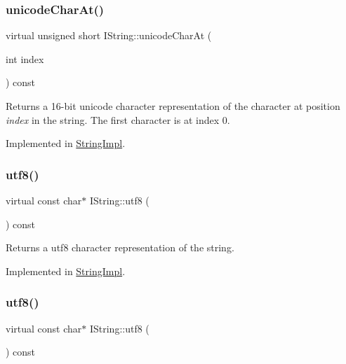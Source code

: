 \subsubsection{\texorpdfstring{unicodeCharAt()}{unicodeCharAt()}\hspace{0.1cm}{\footnotesize\ttfamily [2/2]}}
{\footnotesize\ttfamily virtual unsigned short I\+String\+::unicode\+Char\+At (\begin{DoxyParamCaption}\item[{int}]{index }\end{DoxyParamCaption}) const\hspace{0.3cm}{\ttfamily [pure virtual]}}

Returns a 16-\/bit unicode character representation of the character at position {\itshape index} in the string. The first character is at index 0. 

Implemented in \mbox{\hyperlink{class_string_impl_a002b2e0e2a91769a583437b6510ed409}{String\+Impl}}.

\mbox{\label{class_i_string_a552cdb2900b094a432a8608df7bcce8c}} 
\subsubsection{\texorpdfstring{utf8()}{utf8()}\hspace{0.1cm}{\footnotesize\ttfamily [1/2]}}
{\footnotesize\ttfamily virtual const char$\ast$ I\+String\+::utf8 (\begin{DoxyParamCaption}{ }\end{DoxyParamCaption}) const\hspace{0.3cm}{\ttfamily [pure virtual]}}

Returns a utf8 character representation of the string. 

Implemented in \mbox{\hyperlink{class_string_impl_a9e7c386a3cd20feb6dea3d98b559535c}{String\+Impl}}.

\mbox{\label{class_i_string_a552cdb2900b094a432a8608df7bcce8c}} 
\subsubsection{\texorpdfstring{utf8()}{utf8()}\hspace{0.1cm}{\footnotesize\ttfamily [2/2]}}
{\footnotesize\ttfamily virtual const char$\ast$ I\+String\+::utf8 (\begin{DoxyParamCaption}{ }\end{DoxyParamCaption}) const\hspace{0.3cm}{\ttfamily [pure virtual]}}

